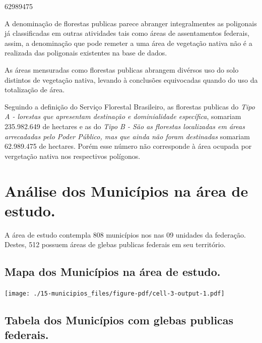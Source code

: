 \documentclass[
  letterpaper,
]{report}
\begin{document}
62989475

\n    

\n  

\n

A denominação de florestas publicas parece abranger integralmentes as
poligonais já classificadas em outras atividades tais como áreas de
assentamentos federais, assim, a denominação que pode remeter a uma área
de vegetação nativa não é a realizada das poligonais existentes na base
de dados.

As áreas mensuradas como florestas publicas abrangem divérsos uso do
solo distintos de vegetação nativa, levando à conclusões equivocadas
quando do uso da totalização de área.

Seguindo a definição do Serviço Florestal Brasileiro, as florestas
publicas do \emph{Tipo A - lorestas que apresentam destinação e
dominialidade específica}, somariam 235.982.649 de hectares e as do
\emph{Tipo B - São as florestas localizadas em áreas arrecadadas pelo
Poder Público, mas que ainda não foram destinadas} somariam 62.989.475
de hectares. Porém esse número não corresponde à área ocupada por
vergetação nativa nos respectivos polígonos.


\hypertarget{anuxe1lise-dos-municuxedpios-na-uxe1rea-de-estudo.}{%
\chapter{Análise dos Municípios na área de
estudo.}\label{anuxe1lise-dos-municuxedpios-na-uxe1rea-de-estudo.}}

A área de estudo contempla 808 municípios nos nas 09 unidades da
federação. Destes, 512 possuem áreas de glebas publicas federais em seu
território.

\hypertarget{mapa-dos-municuxedpios-na-uxe1rea-de-estudo.}{%
\section{Mapa dos Municípios na área de
estudo.}\label{mapa-dos-municuxedpios-na-uxe1rea-de-estudo.}}

\texttt{[image: ./15-municipios\_files/figure-pdf/cell-3-output-1.pdf]}

\hypertarget{tabela-dos-municuxedpios-com-glebas-publicas-federais.}{%
\section{Tabela dos Municípios com glebas publicas
federais.}\label{tabela-dos-municuxedpios-com-glebas-publicas-federais.}}
\end{document}
